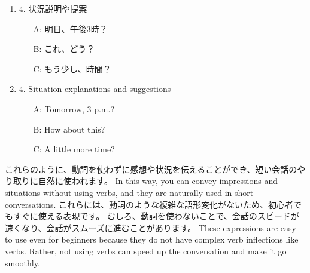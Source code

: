 \documentclass[uplatex,dvipdfmx,b5paper,english,10pt]{jsbook}
\begin{document}
\begin{enumerate}
  \ifJapanese
  \item 4. 状況説明や提案
    \begin{itemize}
      \item[A:] 明日、午後3時？
      \item[B:] これ、どう？
      \item[C:] もう少し、時間？
    \end{itemize}
 \else
  \item 4. Situation explanations and suggestions
    \begin{itemize}
      \item[A:] Tomorrow, 3 p.m.?
      \item[B:] How about this?
      \item[C:] A little more time?
    \end{itemize}
  \fi
\end{enumerate}

\ifJapanese
これらのように、動詞を使わずに感想や状況を伝えることができ、短い会話のやり取りに自然に使われます。
\else
In this way, you can convey impressions and situations without using verbs, and they are naturally used in short conversations.
\fi
\ifJapanese
  これらには、動詞のような複雑な語形変化がないため、初心者でもすぐに使える表現です。
  むしろ、動詞を使わないことで、会話のスピードが速くなり、会話がスムーズに進むことがあります。
\else
  These expressions are easy to use even for beginners because they do not have complex verb inflections like verbs.
  Rather, not using verbs can speed up the conversation and make it go smoothly.
\fi
\end{document}
